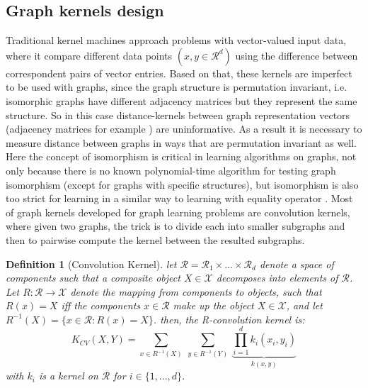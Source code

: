 \subsection{Graph kernels design}
Traditional kernel machines approach problems with vector-valued input data, where it compare different data points $(x,y \in \mathcal{R}^d)$ using the difference between correspondent pairs of vector entries. Based on that, these kernels are imperfect to be used with graphs, since the graph structure is permutation invariant, i.e. isomorphic graphs have different adjacency matrices but they represent the same structure. So in this case distance-kernels between graph representation vectors (adjacency matrices for example ) are uninformative. As a result it is necessary to measure distance between graphs in ways that are  permutation invariant as well. Here the concept of isomorphism is critical in learning algorithms on graphs,  not only because there is no known polynomial-time algorithm for testing graph isomorphism (except for graphs with specific structures), but isomorphism is also too strict for learning in a similar way to learning with equality operator \citep{kriege_graph_kernels}. \newline
Most of graph kernels developed for graph learning problems are convolution kernels, where given two graphs, the trick is to divide each into smaller subgraphs and then to pairwise compute the kernel between the resulted subgraphs.
\newtheorem{definition}{Definition} 
\begin{definition}[Convolution Kernel]
let $\mathcal{R}=\mathcal{R}_1\times...\times \mathcal{R}_d$ denote a space of components such that a composite object $X\in \mathcal{X}$ decomposes into elements of $\mathcal{R}$. Let $R:\mathcal{R}\xrightarrow{}\mathcal{X}$ denote the mapping from components to objects, such that $R(x)=X$ iff the components $x\in \mathcal{R}$ make up the object $X\in \mathcal{X}$, and let $R^{-1}(X)=\{x\in\mathcal{R}:R(x)=X\}$. then, the R-convolution kernel is:
\begin{equation}
\label{eq:conolutional_kernels}
    K_{CV}(X,Y)=\sum_{x\in R^{-1}(X)}~\sum_{y\in R^{-1}(Y)}~\underbrace{\prod_{i=1}^{d}k_i(x_i,y_i)}_{k(x,y)}
\end{equation}
with $k_i$ is a kernel on $\mathcal{R}$ for $i\in\{1,...,d\}$.
\end{definition}

